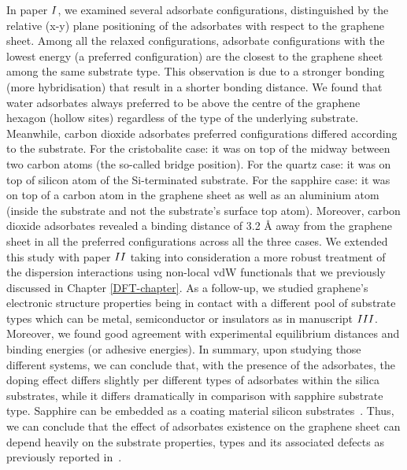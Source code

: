 In paper \hyperref[P1]{$\Rmnum{1}$}, we examined several adsorbate configurations, distinguished by the relative (x-y) plane positioning of the adsorbates with respect to the graphene sheet. Among all the relaxed configurations, adsorbate configurations with the lowest energy (a preferred configuration) are the closest to the graphene sheet among the same substrate type. This observation is due to a stronger bonding (more hybridisation) that result in a shorter bonding distance. We found that water adsorbates always preferred to be above the centre of the graphene hexagon (hollow sites) regardless of the type of the underlying substrate. Meanwhile, carbon dioxide adsorbates preferred configurations differed according to the substrate. For the cristobalite case: it was on top of the midway between two carbon atoms (the so-called bridge position). For the quartz case: it was on top of silicon atom of the Si-terminated substrate. For the sapphire case: it was on top of a carbon atom in the graphene sheet as well as an aluminium atom (inside the substrate and not the substrate's surface top atom). Moreover, carbon dioxide adsorbates revealed a binding distance of 3.2 Å away from the graphene sheet in all the preferred configurations across all the three cases. We extended this study with paper \hyperref[P2]{$\Rmnum{2}$} taking into consideration a more robust treatment of the dispersion interactions using non-local vdW functionals that we previously discussed in Chapter \ref{DFT-chapter}. As a follow-up, we studied graphene's electronic structure properties being in contact with a different pool of substrate types which can be metal, semiconductor or insulators as in manuscript \hyperref[P3]{$\Rmnum{3}$}. Moreover, we found good agreement with experimental equilibrium distances and binding energies (or adhesive energies).
\clearpage
In summary, upon studying those different systems, we can conclude that, with the presence of the adsorbates, the doping effect differs slightly per different types of adsorbates within the silica substrates, while it differs dramatically in comparison with sapphire substrate type. Sapphire can be embedded as a coating material silicon substrates~\cite{Jadaun2011}. Thus, we can conclude that the effect of adsorbates existence on the graphene sheet can depend heavily on the substrate properties, types and its associated defects as previously reported in~\cite{Wehling2008}.

